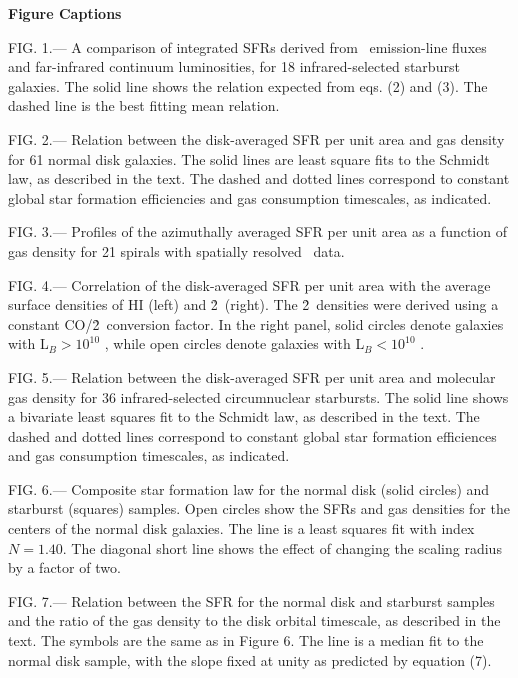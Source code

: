 {\bf Figure Captions}

FIG. 1.--- A comparison of integrated SFRs derived from \brgamma\
emission-line fluxes and far-infrared continuum luminosities, for 18
infrared-selected starburst galaxies.  The solid line shows the 
relation expected from eqs. (2) and (3).  The dashed line is the
best fitting mean relation.

FIG. 2.--- Relation between the disk-averaged SFR per unit area
and gas density for 61 normal disk galaxies.  The solid lines are  
least square fits to the Schmidt law, as described in the text.
The dashed and dotted
lines correspond to constant global star formation efficiencies
and gas consumption timescales, as indicated.

FIG. 3.--- Profiles of the azimuthally averaged SFR per unit area
as a function of gas density for 21 spirals with spatially resolved
\halpha\ data.  

FIG. 4.--- Correlation of the disk-averaged SFR per unit area
with the average surface densities of HI (left) and \h2\ (right).
The \h2\ densities were derived using a constant CO/\h2\ conversion
factor.  In the right panel, solid circles denote galaxies with
L$_B > 10^{10}$ \lsun, while open circles denote galaxies with 
L$_B < 10^{10}$ \lsun. 

FIG. 5.--- Relation between the disk-averaged SFR per unit area
and molecular gas density for 36 infrared-selected circumnuclear 
starbursts.  The solid line shows a bivariate least squares fit 
to the Schmidt law,
as described in the text.  The dashed and dotted lines correspond to
constant global star formation efficiences and gas consumption timescales,
as indicated.

FIG. 6.--- Composite star formation law for the normal disk (solid
circles) and starburst (squares) samples.  Open circles show the SFRs
and gas densities for the centers of the normal disk galaxies.
The line is a least squares fit with index $N = 1.40$.  The diagonal
short line shows the effect of changing the scaling radius by a factor of 
two.

FIG. 7.--- Relation between the SFR for the normal disk and starburst
samples and the ratio of the gas density to the disk orbital timescale,
as described in the text.  The symbols are the same as in Figure 6.
The line is a median fit to the normal disk sample, with the slope
fixed at unity as predicted by equation (7).



